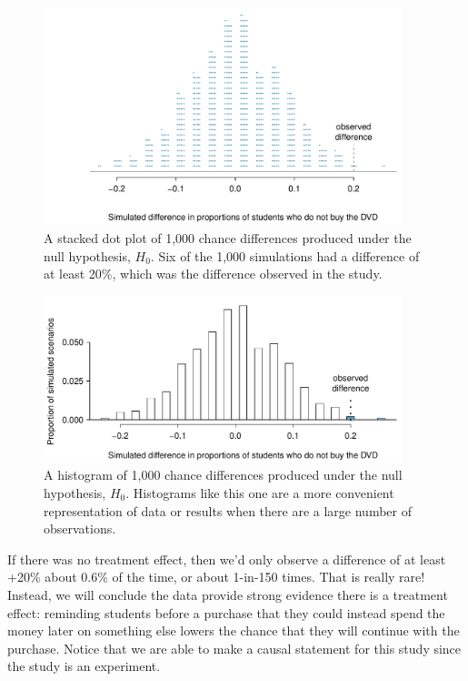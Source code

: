 \begin{figure}[p]
\centering
\includegraphics[width=0.93\textwidth]{05/figures/OpportunityCost/OpportunityCostDiffsDotPlot}
\caption{A stacked dot plot of 1,000 chance differences produced under the null hypothesis, $H_0$. Six of the 1,000 simulations had a difference of at least 20\%, which was the difference observed in the study.}
\label{OpportunityCostDiffsDotPlot}
\end{figure}

\begin{figure}[p]
\centering
\includegraphics[width=0.93\textwidth]{05/figures/OpportunityCost/OpportunityCostDiffsRightTail}
\caption{A histogram of 1,000 chance differences produced under the null hypothesis, $H_0$. Histograms like this one are a more convenient representation of data or results when there are a large number of observations.}
\label{OpportunityCostDiffs}
\end{figure}

If there was no treatment effect, then we'd only observe a difference of at least +20\% about 0.6\% of the time, or about 1-in-150 times. That is really rare! Instead, we will conclude the data provide strong evidence there is a treatment effect: reminding students before a purchase that they could instead spend the money later on something else lowers the chance that they will continue with the purchase. Notice that we are able to make a causal statement for this study since the study is an experiment.

